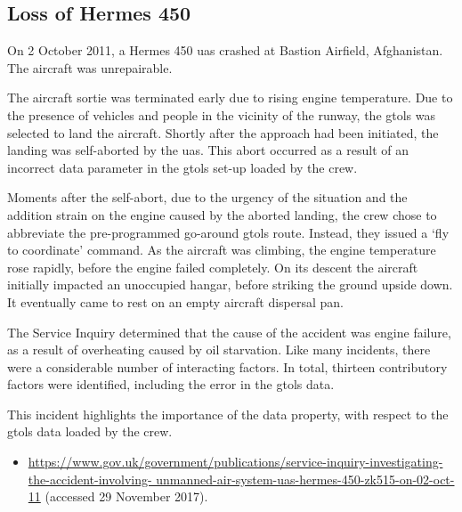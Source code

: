 \subsection{Loss of Hermes 450} \label{bkm:incacc:hermes450}
On 2 October 2011, a Hermes 450 \gls{uas} crashed at Bastion Airfield, Afghanistan. The aircraft was unrepairable.

The aircraft sortie was terminated early due to rising engine temperature. Due to the presence of vehicles and people in the vicinity of the runway, the \gls{gtols} was selected to land the aircraft. Shortly after the approach had been initiated, the landing was self-aborted by the \gls{uas}. This abort occurred as a result of an incorrect data parameter in the \gls{gtols} set-up loaded by the crew.

Moments after the self-abort, due to the urgency of the situation and the addition strain on the engine caused by the aborted landing, the crew chose to abbreviate the pre-programmed go-around \gls{gtols} route. Instead, they issued a `fly to coordinate' command. As the aircraft was climbing, the engine temperature rose rapidly, before the engine failed completely. On its descent the aircraft initially impacted an unoccupied hangar, before striking the ground upside down. It eventually came to rest on an empty aircraft dispersal pan.

The Service Inquiry determined that the cause of the accident was engine failure, as a result of overheating caused by oil starvation. Like many incidents, there were a considerable number of interacting factors. In total, thirteen contributory factors were identified, including the error in the \gls{gtols} data.

This incident highlights the importance of the  \gls{data property}, with respect to the \gls{gtols} data loaded by the crew.

\begin{samepage}
\begin{itemize}
	\item \raggedright{\href{https://www.gov.uk/government/publications/service-inquiry-investigating-the-accident-involving-unmanned-air-system-uas-hermes-450-zk515-on-02-oct-11}{https://www.gov.uk/government/publications/service-inquiry-investigating-the-accident-involving- unmanned-air-system-uas-hermes-450-zk515-on-02-oct-11} (accessed 29 November 2017).}
\end{itemize}
\end{samepage}


